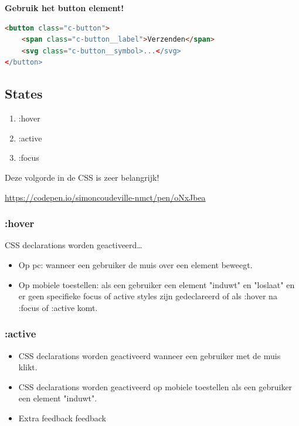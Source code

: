 \documentclass{article}
\newcommand{\bold}[1]{\textbf{#1}}
\begin{document}
\bold{Gebruik het button element!}

\begin{lstlisting}[language=HTML]
<button class="c-button">
    <span class="c-button__label">Verzenden</span>
    <svg class="c-button__symbol>...</svg>
</button>
\end{lstlisting}

\subsection{States}
\begin{enumerate}
    \item :hover
    \item :active
    \item :focus
\end{enumerate}

Deze volgorde in de CSS is zeer belangrijk!

\url{https://codepen.io/simoncoudeville-nmct/pen/oNxJbea}

\subsubsection{:hover}

CSS declarations worden geactiveerd\dots

\begin{itemize}
    \item Op pc: wanneer een gebruiker de muis over een element beweegt.
    \item Op mobiele toestellen: als een gebruiker een element "induwt" en "loslaat" en er geen specifieke focus of active styles zijn gedeclareerd of als :hover na :focus of :active komt.
\end{itemize}

\subsubsection{:active}

\begin{itemize}
    \item CSS declarations worden geactiveerd wanneer een gebruiker met de muis klikt.
    \item CSS declarations worden geactiveerd op mobiele toestellen als een gebruiker een element "induwt".
    \item Extra feedback feedback
\end{itemize}
\end{document}
